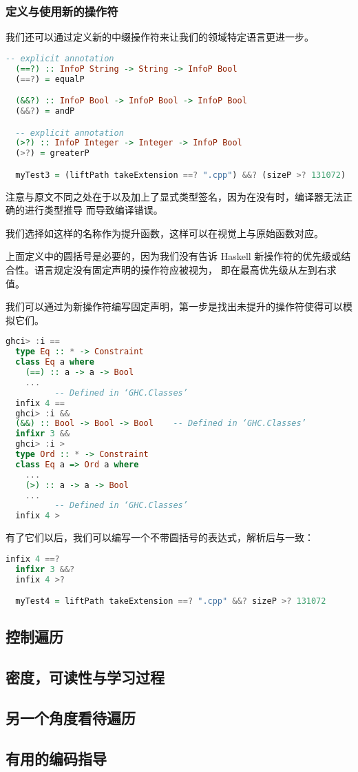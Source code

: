 \documentclass[./main.tex]{subfiles}
\begin{document}
\subsubsection*{定义与使用新的操作符}

我们还可以通过定义新的中缀操作符来让我们的领域特定语言更进一步。

\begin{lstlisting}[language=Haskell]
  -- explicit annotation
  (==?) :: InfoP String -> String -> InfoP Bool
  (==?) = equalP

  (&&?) :: InfoP Bool -> InfoP Bool -> InfoP Bool
  (&&?) = andP

  -- explicit annotation
  (>?) :: InfoP Integer -> Integer -> InfoP Bool
  (>?) = greaterP

  myTest3 = (liftPath takeExtension ==? ".cpp") &&? (sizeP >? 131072)
\end{lstlisting}

注意与原文不同之处在于以及加上了显式类型签名，因为在没有时，编译器无法正确的进行类型推导
而导致编译错误。

我们选择如这样的名称作为提升函数，这样可以在视觉上与原始函数对应。

上面定义中的圆括号是必要的，因为我们没有告诉 Haskell 新操作符的优先级或结合性。语言规定没有固定声明的操作符应被视为，
即在最高优先级从左到右求值。

我们可以通过为新操作符编写固定声明，第一步是找出未提升的操作符使得可以模拟它们。

\begin{lstlisting}[language=Haskell]
  ghci> :i ==
  type Eq :: * -> Constraint
  class Eq a where
    (==) :: a -> a -> Bool
    ...
          -- Defined in ‘GHC.Classes’
  infix 4 ==
  ghci> :i &&
  (&&) :: Bool -> Bool -> Bool    -- Defined in ‘GHC.Classes’
  infixr 3 &&
  ghci> :i >
  type Ord :: * -> Constraint
  class Eq a => Ord a where
    ...
    (>) :: a -> a -> Bool
    ...
          -- Defined in ‘GHC.Classes’
  infix 4 >
\end{lstlisting}

有了它们以后，我们可以编写一个不带圆括号的表达式，解析后与一致：

\begin{lstlisting}[language=Haskell]
  infix 4 ==?
  infixr 3 &&?
  infix 4 >?

  myTest4 = liftPath takeExtension ==? ".cpp" &&? sizeP >? 131072
\end{lstlisting}

\subsection*{控制遍历}

\subsection*{密度，可读性与学习过程}

\subsection*{另一个角度看待遍历}

\subsection*{有用的编码指导}
\end{document}
